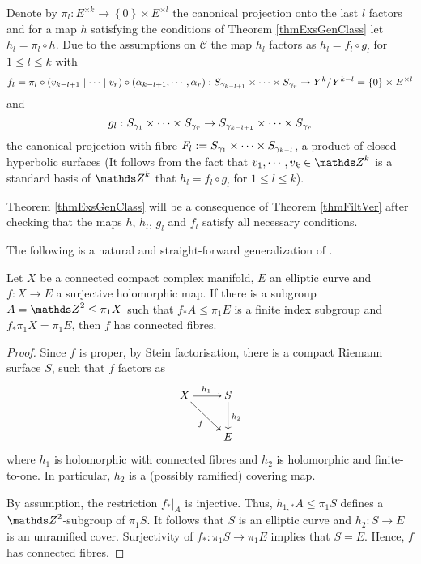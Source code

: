 Denote by $\pi_l : E^{\times k}\rightarrow \left\{0\right\} \times E^{\times l}$ the canonical projection onto the last $l$ factors and for a map $h$ satisfying the conditions of Theorem \ref{thmExsGenClass} let $h_l=\pi_l\circ h$. Due to the assumptions on $\mathcal{C}$ the map $h_l$ factors as $h_l= f_l\circ g_l$ for $1\leq l \leq k$ with
 \[
  f_l=\pi_l \circ \left(v_{k-l+1} \mid \cdots  \mid v_r\right)\circ(\alpha _{k-l+1},\cdots, \alpha _r):  S_{\gamma_{k-l+1}}\times \cdots \times S_{\gamma_r}\rightarrow Y^k/Y^{k-l}= \left\{0\right\} \times E^{\times l}  
 \]
 and
 \[
 g_l: S_{\gamma_1}\times \cdots \times S_{\gamma_r}\rightarrow  S_{\gamma_{k-l+1}} \times \cdots \times S_{\gamma_r}
 \]
 the canonical projection with fibre $F_l:= S_{\gamma_1}\times \cdots \times S_{\gamma_{k-l}}$, a product of closed hyperbolic surfaces (It follows from the fact that $v_1,\cdots, v_k\in \ZZ^k$ is a standard basis of $\ZZ^k$ that $h_l=f_l\circ g_l$ for $1\leq l \leq k$).

Theorem \ref{thmExsGenClass} will be a consequence of Theorem \ref{thmFiltVer} after checking that the maps $h$, $h_l$, $g_l$ and $f_l$ satisfy all necessary conditions.







The following is a natural and straight-forward generalization of \cite[Lemma 2.1]{Llo-16-II}.

\begin{lemma}
\label{lemNewConnFib}
 Let $X$ be a connected compact complex manifold, $E$ an elliptic curve and $f: X \rightarrow E$ a surjective holomorphic map. If there is a subgroup $A=\ZZ^2 \leq \pi_1 X$ such that $f_{\ast} A \leq \pi_1 E$ is a finite index subgroup and $f_{\ast} \pi_1 X = \pi_1 E$, then $f$ has connected fibres.
\end{lemma}

\begin{proof}
 Since $f$ is proper, by Stein factorisation, there is a compact Riemann surface $S$, such that $f$ factors as
 \[
 \xymatrix{ X \ar[r]^{h_1} \ar[rd]_f & S\ar[d] ^{h_2}\\ & E}
 \]
 where $h_1$ is holomorphic with connected fibres and $h_2$ is holomorphic and finite-to-one. In particular, $h_2$ is a (possibly ramified) covering map. 
 
 By assumption, the restriction $f_{\ast}|_A$ is injective. Thus, $h_{1,\ast} A\leq \pi_1 S$ defines a $\ZZ^2$-subgroup of $\pi_1S$. It follows that $S$ is an elliptic curve and $h_2: S\to E$ is an unramified cover. Surjectivity of $f_{\ast}: \pi_1 S\to \pi_1 E$ implies that $S=E$. Hence, $f$ has connected fibres.
\end{proof}


